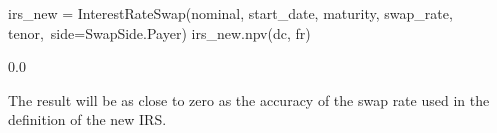 \begin{ipython}
irs_new = InterestRateSwap(nominal, start_date, maturity, swap_rate, tenor,\
                           side=SwapSide.Payer)
irs_new.npv(dc, fr)\end{ipython}
\begin{ioutput}
0.0
\end{ioutput}
\noindent
The result will be as close to zero as the accuracy of the swap rate used in the definition of the new IRS.
   
%
%
%
%
%
%
%
